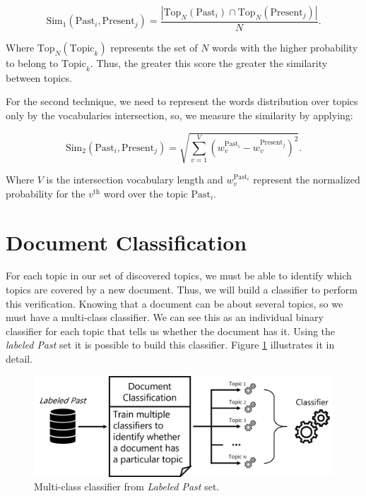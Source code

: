 \begin{equation}
	\label{eq:top-n-match}
	\text{Sim}_{1}\left(\text{Past}_{i}, \text{Present}_{j}\right) = \dfrac{|\text{Top}_{N}(\text{Past}_{i}) \cap \text{Top}_{N}(\text{Present}_{j})|}{N} \text{.}
\end{equation}

Where $\text{Top}_{N}(\text{Topic}_{k})$ represents the set of $N$ words with the higher probability to belong to $\text{Topic}_{k}$. Thus, the greater this score the greater the similarity between topics.

For the second technique, we need to represent the words distribution over topics only by the vocabularies intersection, so, we measure the similarity by applying:

\begin{equation}
	\label{eq:global-match}
	\text{Sim}_{2}\left(\text{Past}_{i}, \text{Present}_{j}\right) = \sqrt{\sum_{v=1}^{V} \left(w_{v}^{\text{Past}_{i}} - w_{v}^{\text{Present}_{j}}\right)^2} \text{.}
\end{equation}

Where $V$ is the intersection vocabulary length and $w_{v}^{\text{Past}_{i}}$ represent the normalized probability for the $v^{\text{th}}$ word over the topic $\text{Past}_{i}$.

\section{Document Classification}

For each topic in our set of discovered topics, we must be able to identify which topics are covered by a new document. Thus, we will build a classifier to perform this verification. Knowing that a document can be about several topics, so we must have a multi-class classifier. We can see this as an individual binary classifier for each topic that tells us whether the document has it. Using the \textit{labeled Past} set it is possible to build this classifier. Figure \ref{fig:document-classification} illustrates it in detail.

\begin{figure}[h!]
	\centering
	\includegraphics[width=0.9\linewidth]{01.Chapters/04.Materials/document-classification}
	\caption{Multi-class classifier from \textit{Labeled Past} set.}
	\label{fig:document-classification}
\end{figure}

